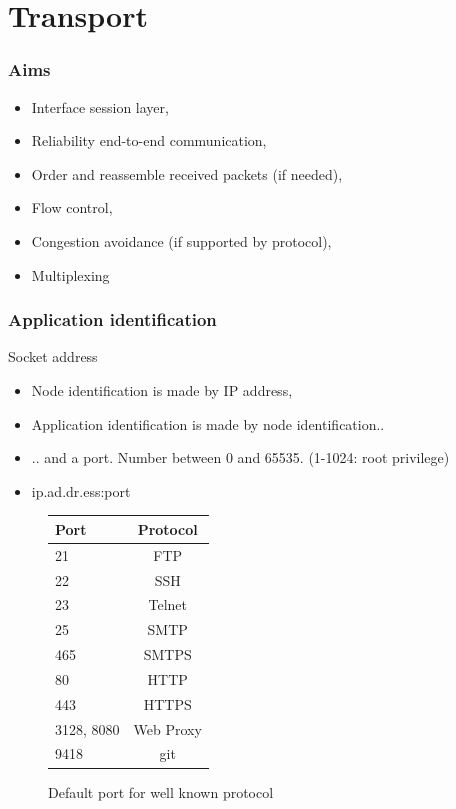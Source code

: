 \section{Transport}
  \begin{frame}
    \frametitle{Aims}
      \begin{itemize}
        \item Interface session layer,
        \item Reliability end-to-end communication,
        \item Order and reassemble received packets (if needed),
        \item Flow control,
        \item Congestion avoidance (if supported by protocol),
        \item Multiplexing
      \end{itemize}
  \end{frame}

  \begin{frame}
    \frametitle{Application identification}
    \begin{block}{Socket address}
      \begin{itemize}
        \item Node identification is made by IP address,
        \item Application identification is made by node identification..
        \item .. and a port. Number between 0 and 65535. (1-1024: root privilege)
        \item \begin{center} ip.ad.dr.ess:port \end{center}
      \end{itemize}
    \end{block}
  \end{frame}

  \begin{frame}
    \begin{figure}
      \centering
      \begin{tabular}{l|c}
        Port & Protocol \\ \hline
        21 & FTP \\ \hline
        22 & SSH \\ \hline
        23 & Telnet \\ \hline
        25 & SMTP \\ \hline
        465 & SMTPS \\ \hline
        80 & HTTP \\ \hline
        443 & HTTPS \\ \hline
        3128, 8080 & Web Proxy \\ \hline
        9418 & git \\ \hline
      \end{tabular}
      \caption{Default port for well known protocol}
      \label{fig:def-port}
    \end{figure}
  \end{frame}

